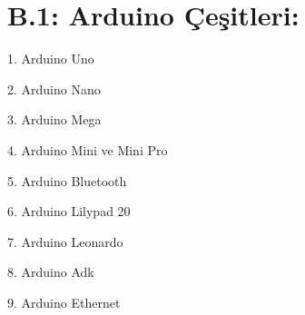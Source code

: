 \clearpage
\section{B.1: Arduino Çeşitleri: }
\label{CH:AltBolum2.1}

1. Arduino Uno 	

2. Arduino Nano	

3. Arduino Mega  

4. Arduino Mini ve Mini Pro 

5. Arduino Bluetooth 

6. Arduino Lilypad 20 	

7. Arduino Leonardo

8. Arduino Adk 		

9. Arduino Ethernet
